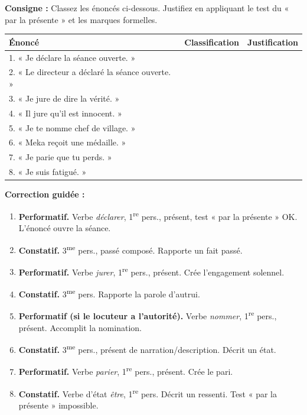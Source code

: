 \documentclass[11pt]{article}
\begin{document}
\begin{experience}
\textbf{Consigne :} Classez les énoncés ci-dessous. Justifiez en appliquant le test du « par la présente » et les marques formelles.

\begin{center}
\begin{tabularx}{\linewidth}{|l|X|X|}\hline
\textbf{Énoncé} & \textbf{Classification} & \textbf{Justification} \\ \hline
1. « Je déclare la séance ouverte. » & & \\ \hline
2. « Le directeur a déclaré la séance ouverte. » & & \\ \hline
3. « Je jure de dire la vérité. » & & \\ \hline
4. « Il jure qu'il est innocent. » & & \\ \hline
5. « Je te nomme chef de village. » & & \\ \hline
6. « Meka reçoit une médaille. » & & \\ \hline
7. « Je parie que tu perds. » & & \\ \hline
8. « Je suis fatigué. » & & \\ \hline
\end{tabularx}
\end{center}

\tcblower
\textbf{Correction guidée :}
\begin{enumerate}
    \item \textbf{Performatif.} Verbe \emph{déclarer}, 1\textsuperscript{re} pers., présent, test « par la présente » OK. L'énoncé ouvre la séance.
    \item \textbf{Constatif.} 3\textsuperscript{me} pers., passé composé. Rapporte un fait passé.
    \item \textbf{Performatif.} Verbe \emph{jurer}, 1\textsuperscript{re} pers., présent. Crée l'engagement solennel.
    \item \textbf{Constatif.} 3\textsuperscript{me} pers. Rapporte la parole d'autrui.
    \item \textbf{Performatif (si le locuteur a l'autorité).} Verbe \emph{nommer}, 1\textsuperscript{re} pers., présent. Accomplit la nomination.
    \item \textbf{Constatif.} 3\textsuperscript{me} pers., présent de narration/description. Décrit un état.
    \item \textbf{Performatif.} Verbe \emph{parier}, 1\textsuperscript{re} pers., présent. Crée le pari.
    \item \textbf{Constatif.} Verbe d'état \emph{être}, 1\textsuperscript{re} pers. Décrit un ressenti. Test « par la présente » impossible.
\end{enumerate}
\end{experience}
\end{document}
